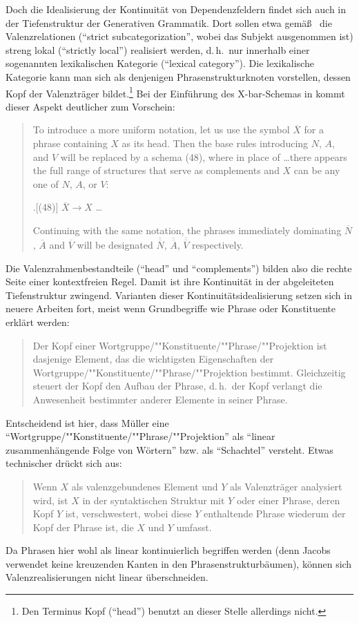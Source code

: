 Doch die Idealisierung der Kontinuität von Dependenzfeldern findet sich auch in der Tiefenstruktur der Generativen Grammatik. Dort sollen etwa gemä\ss\ \citet[122,215]{Chomsky:65} die Valenzrelationen ("`strict subcategorization"', wobei das Subjekt ausgenommen ist) streng lokal ("`strictly local"') realisiert werden, d.\,h.\ nur innerhalb einer sogenannten lexikalischen Kategorie ("`lexical category"'). Die lexikalische Kategorie kann man sich als denjenigen Phrasenstrukturknoten vorstellen, dessen Kopf der Valenzträger bildet.\footnote{Den Terminus Kopf ("`head"') benutzt \cite{Chomsky:65} an dieser Stelle allerdings nicht.} Bei der Einführung des X-bar-Schemas in \cite{Chomsky:70} kommt dieser Aspekt deutlicher zum Vorschein:
\begin{quote}
To introduce a more uniform notation, let us use the
symbol $\overline{X}$ for a phrase containing $X$ as its head. Then the base rules introducing $N$, $A$, and $V$ will be replaced by a schema (48), where in place
of \ldots there appears the full range of structures that serve as complements
and $X$ can be any one of $N$, $A$, or $V$:

\ex.[(48)] $\overline{X} \to X$ \ldots

Continuing with the same notation, the phrases immediately dominating $\overline{N}$,
$\overline{A}$ and $\overline{V}$ will be designated $\overline{\overline{N}}$, $\overline{\overline{A}}$, $\overline{\overline{V}}$ respectively. \cite[210]{Chomsky:70} 
\end{quote}    
Die Valenzrahmenbestandteile ("`head"' und "`complements"') bilden also die rechte Seite einer kontextfreien Regel. Damit ist ihre Kontinuität in der abgeleiteten Tiefenstruktur zwingend. Varianten dieser Kontinuitätsidealisierung setzen sich in neuere Arbeiten fort, meist wenn Grundbegriffe wie Phrase oder Konstituente erklärt werden:
\begin{quote}
Der Kopf einer Wortgruppe/""Konstituente/""Phrase/""Projektion ist dasjenige Element, das die wichtigsten Eigenschaften der Wortgruppe/""Konstituente/""Phrase/""Projektion bestimmt. Gleichzeitig steuert der Kopf den Aufbau der Phrase, d.\,h.\ der Kopf verlangt die Anwesenheit bestimmter anderer Elemente in seiner Phrase. \cite[19]{Mueller:10}
\end{quote}
Entscheidend ist hier, dass Müller eine "`Wortgruppe/""Konstituente/""Phrase/""Projektion"' als "`linear zusammenhängende Folge von Wörtern"' \cite[4]{Mueller:10} bzw. als "`Schachtel"' \cite[Abbildung~1.1]{Mueller:10} versteht. Etwas technischer drückt sich \cite{Jacobs:09} aus:
\begin{quote}
Wenn $X$ als valenzgebundenes Element und $Y$ als Valenzträger analysiert wird, ist $X$ in der syntaktischen Struktur mit $Y$ oder einer Phrase, deren Kopf $Y$ ist, verschwestert, wobei diese $Y$ enthaltende Phrase wiederum der Kopf der Phrase ist, die $X$ und $Y$ umfasst. \cite[497]{Jacobs:09}
\end{quote}
Da Phrasen hier wohl als linear kontinuierlich begriffen werden (denn Jacobs verwendet keine kreuzenden Kanten in den Phrasenstrukturbäumen), können sich Valenzrealisierungen nicht linear überschneiden.  

